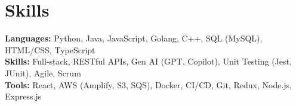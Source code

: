 \documentclass[11pt]{article}       %
\begin{document}
\vspace{-18.5pt}


\section*{Skills}
\textbf{Languages:} Python, Java, JavaScript, Golang, C++, SQL (MySQL), HTML/CSS, TypeScript\\
\textbf{Skills:} Full-stack, RESTful APIs, Gen AI (GPT, Copilot), Unit Testing (Jest, JUnit), Agile, Scrum\\
\textbf{Tools:} React, AWS (Amplify, S3, SQS), Docker, CI/CD, Git, Redux, Node.js, Express.js\\

\vspace{-6.5pt}
\end{document}
